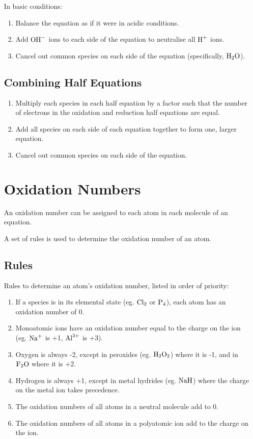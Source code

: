 \documentclass[a4paper,11pt]{article}
\begin{document}
In basic conditions:

\begin{enumerate}
\item Balance the equation as if it were in acidic conditions.
\item Add $\ce{OH-}$ ions to each side of the equation to neutralise all
	$\ce{H+}$ ions.
\item Cancel out common species on each side of the equation (specifically,
	$\ce{H2O}$).
\end{enumerate}

\subsection{Combining Half Equations}

\begin{enumerate}
\item Multiply each species in each half equation by a factor such that the
	number of electrons in the oxidation and reduction half equations are
	equal.
\item Add all species on each side of each equation together to form one, larger
	equation.
\item Cancel out common species on each side of the equation.
\end{enumerate}



\section{Oxidation Numbers}

An oxidation number can be assigned to each atom in each molecule of an
equation.

A set of rules is used to determine the oxidation number of an atom.

\subsection{Rules}

Rules to determine an atom's oxidation number, listed in order of priority:

\begin{enumerate}
\item If a species is in its elemental state (eg. $\ce{Cl2}$ or $\ce{P4}$), each
	atom has an oxidation number of 0.
\item Monoatomic ions have an oxidation number equal to the charge on the ion
	(eg. $\ce{Na^{+}}$ is +1, $\ce{Al^{3+}}$ is +3).
\item Oxygen is always -2, except in peroxides (eg. $\ce{H2O2}$) where it is -1,
	and in $\ce{F2O}$ where it is +2.
\item Hydrogen is always +1, except in metal hydrides (eg. $\ce{NaH}$) where the
	charge on the metal ion takes precedence.
\item \label{neutral} The oxidation numbers of all atoms in a neutral molecule
	add to 0.
\item \label{ions} The oxidation numbers of all atoms in a polyatomic ion add
	to the charge on the ion.
\end{enumerate}
\end{document}
